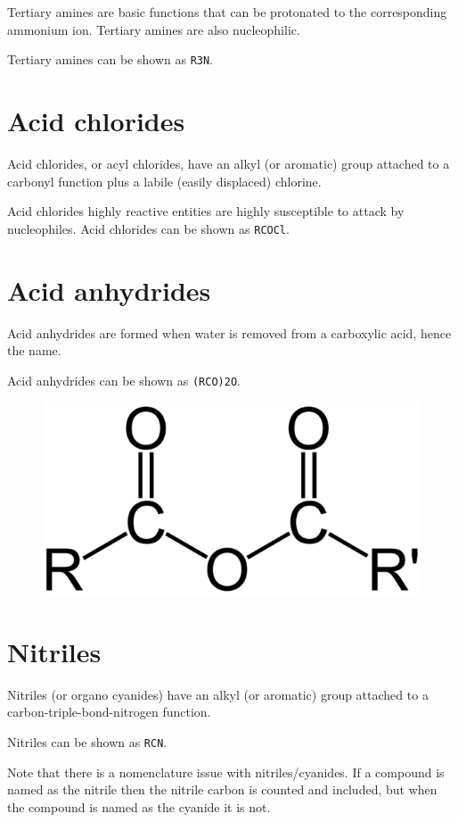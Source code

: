 \documentclass[oneside]{book} %
\theoremstyle{plain}
\begin{document}
Tertiary amines are basic functions that can be protonated to the corresponding
ammonium ion.
Tertiary amines are also nucleophilic.

Tertiary amines can be shown as \texttt{R3N}.

\section{Acid chlorides}
Acid chlorides, or acyl chlorides, have an alkyl (or aromatic) group attached to
a carbonyl function plus a labile (easily displaced) chlorine.

Acid chlorides highly reactive entities are highly susceptible to attack by
nucleophiles.
Acid chlorides can be shown as \texttt{RCOCl}.

\section{Acid anhydrides}
Acid anhydrides are formed when water is removed from a carboxylic acid, hence
the name.

Acid anhydrides can be shown as \texttt{(RCO)2O}.

\begin{figure}[ht]
\includegraphics[scale=0.2]{carboxylic-acid-anhydride.png}
\centering
\end{figure}

\section{Nitriles}
Nitriles (or organo cyanides) have an alkyl (or aromatic) group attached to a
carbon-triple-bond-nitrogen function.

Nitriles can be shown as \texttt{RCN}.

Note that there is a nomenclature issue with nitriles/cyanides. If a compound is
named as the nitrile then the nitrile carbon is counted and included, but when
the compound is named as the cyanide it is not.
\end{document}
